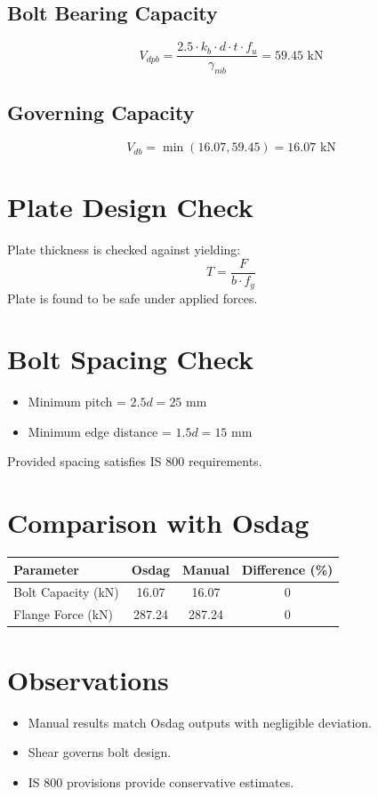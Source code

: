 \subsection{Bolt Bearing Capacity}
\begin{equation}
V_{dpb} = \frac{2.5 \cdot k_b \cdot d \cdot t \cdot f_u}{\gamma_{mb}} = 59.45 \text{ kN}
\end{equation}

\subsection{Governing Capacity}
\begin{equation}
V_{db} = \min(16.07, 59.45) = 16.07 \text{ kN}
\end{equation}

\section{Plate Design Check}
Plate thickness is checked against yielding:
\begin{equation}
T = \frac{F}{b \cdot f_y}
\end{equation}
Plate is found to be safe under applied forces.

\section{Bolt Spacing Check}
\begin{itemize}
    \item Minimum pitch = $2.5d = 25$ mm
    \item Minimum edge distance = $1.5d = 15$ mm
\end{itemize}
Provided spacing satisfies IS 800 requirements.

\section{Comparison with Osdag}
\begin{center}
\begin{tabular}{lccc}
\toprule
Parameter & Osdag & Manual & Difference (\%) \\
\midrule
Bolt Capacity (kN) & 16.07 & 16.07 & 0 \\
Flange Force (kN) & 287.24 & 287.24 & 0 \\
\bottomrule
\end{tabular}
\end{center}

\section{Observations}
\begin{itemize}
    \item Manual results match Osdag outputs with negligible deviation.
    \item Shear governs bolt design.
    \item IS 800 provisions provide conservative estimates.
\end{itemize}

